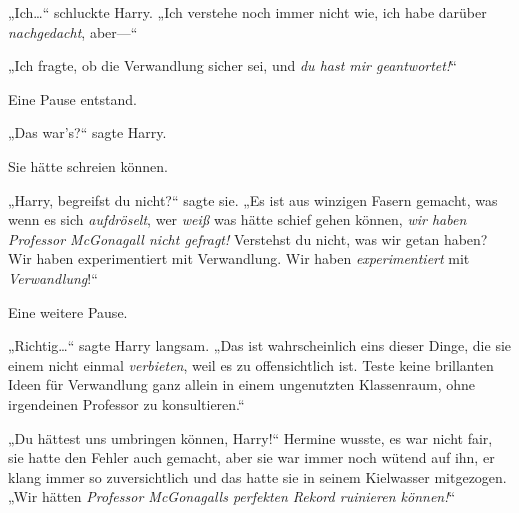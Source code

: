 „Ich…“ schluckte Harry. „Ich verstehe noch immer nicht wie, ich habe darüber \emph{nachgedacht}, aber—“

„Ich fragte, ob die Verwandlung sicher sei, und \emph{du hast mir geantwortet!}“

Eine Pause entstand.

„Das war’s?“ sagte Harry.

Sie hätte schreien können.

„Harry, begreifst du nicht?“ sagte sie. „Es ist aus winzigen Fasern gemacht, was wenn es sich \emph{aufdröselt}, wer \emph{weiß} was hätte schief gehen können, \emph{wir haben Professor McGonagall nicht gefragt!} Verstehst du nicht, was wir getan haben? Wir haben experimentiert mit Verwandlung. Wir haben \emph{experimentiert} mit \emph{Verwandlung}!“

Eine weitere Pause.

„Richtig…“ sagte Harry langsam. „Das ist wahrscheinlich eins dieser Dinge, die sie einem nicht einmal \emph{verbieten}, weil es zu offensichtlich ist. Teste keine brillanten Ideen für Verwandlung ganz allein in einem ungenutzten Klassenraum, ohne irgendeinen Professor zu konsultieren.“

„Du hättest uns umbringen können, Harry!“ Hermine wusste, es war nicht fair, sie hatte den Fehler auch gemacht, aber sie war immer noch wütend auf ihn, er klang immer so zuversichtlich und das hatte sie in seinem Kielwasser mitgezogen. „Wir hätten \emph{Professor McGonagalls perfekten Rekord ruinieren können!}“

